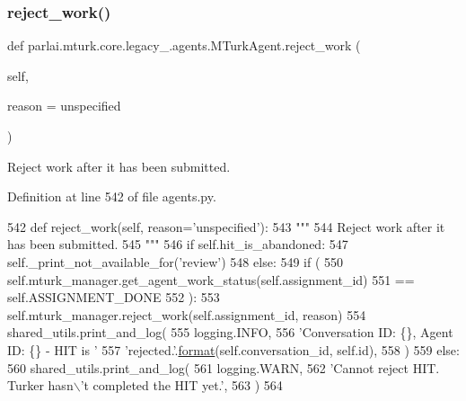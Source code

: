 \subsubsection{\texorpdfstring{reject\+\_\+work()}{reject\_work()}}
{\footnotesize\ttfamily def parlai.\+mturk.\+core.\+legacy\+\_.\+agents.\+M\+Turk\+Agent.\+reject\+\_\+work (\begin{DoxyParamCaption}\item[{}]{self,  }\item[{}]{reason = {\ttfamily \textquotesingle{}unspecified\textquotesingle{}} }\end{DoxyParamCaption})}

\begin{DoxyVerb}Reject work after it has been submitted.
\end{DoxyVerb}
 

Definition at line 542 of file agents.\+py.


\begin{DoxyCode}
542     \textcolor{keyword}{def }reject\_work(self, reason='unspecified'):
543         \textcolor{stringliteral}{"""}
544 \textcolor{stringliteral}{        Reject work after it has been submitted.}
545 \textcolor{stringliteral}{        """}
546         \textcolor{keywordflow}{if} self.hit\_is\_abandoned:
547             self.\_print\_not\_available\_for(\textcolor{stringliteral}{'review'})
548         \textcolor{keywordflow}{else}:
549             \textcolor{keywordflow}{if} (
550                 self.mturk\_manager.get\_agent\_work\_status(self.assignment\_id)
551                 == self.ASSIGNMENT\_DONE
552             ):
553                 self.mturk\_manager.reject\_work(self.assignment\_id, reason)
554                 shared\_utils.print\_and\_log(
555                     logging.INFO,
556                     \textcolor{stringliteral}{'Conversation ID: \{\}, Agent ID: \{\} - HIT is '}
557                     \textcolor{stringliteral}{'rejected.'}.\hyperlink{namespaceparlai_1_1chat__service_1_1services_1_1messenger_1_1shared__utils_a32e2e2022b824fbaf80c747160b52a76}{format}(self.conversation\_id, self.id),
558                 )
559             \textcolor{keywordflow}{else}:
560                 shared\_utils.print\_and\_log(
561                     logging.WARN,
562                     \textcolor{stringliteral}{'Cannot reject HIT. Turker hasn\(\backslash\)'t completed the HIT yet.'},
563                 )
564 
\end{DoxyCode}
\mbox{\label{classparlai_1_1mturk_1_1core_1_1legacy__2018_1_1agents_1_1MTurkAgent_a7c3620ae641e70de1b9d212910ec1158}} 
